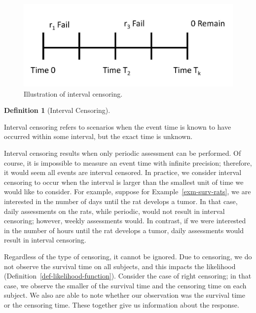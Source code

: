 \documentclass[
  letterpaper,
  DIV=11,
  numbers=noendperiod]{scrreprt}
\theoremstyle{definition}
\newtheorem{definition}{Definition}[chapter]
\theoremstyle{definition}
\theoremstyle{remark}
\begin{document}
\begin{figure}

{\centering \includegraphics{./images/censoring-interval.jpg}

}

\caption{\label{fig-surv-interval-censoring}Illustration of interval
censoring.}

\end{figure}

\begin{definition}[Interval
Censoring]\protect\hypertarget{def-interval-censoring}{}\label{def-interval-censoring}

Interval censoring refers to scenarios when the event time is known to
have occurred within some interval, but the exact time is unknown.

\end{definition}

Interval censoring results when only periodic assessment can be
performed. Of course, it is impossible to measure an event time with
infinite precision; therefore, it would seem all events are interval
censored. In practice, we consider interval censoring to occur when the
interval is larger than the smallest unit of time we would like to
consider. For example, suppose for Example~\ref{exm-surv-rats}, we are
interested in the number of days until the rat develops a tumor. In that
case, daily assessments on the rats, while periodic, would not result in
interval censoring; however, weekly assessments would. In contrast, if
we were interested in the number of hours until the rat develops a
tumor, daily assessments would result in interval censoring.

Regardless of the type of censoring, it cannot be ignored. Due to
censoring, we do not observe the survival time on all subjects, and this
impacts the likelihood (Definition~\ref{def-likelihood-function}).
Consider the case of right censoring; in that case, we observe the
smaller of the survival time and the censoring time on each subject. We
also are able to note whether our observation was the survival time or
the censoring time. These together give us information about the
response.
\end{document}
